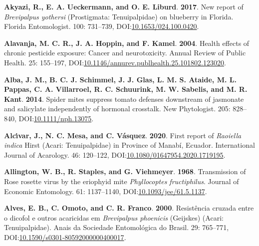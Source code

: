 \documentclass[12pt,final,CPage]{ufthesis}
\newlength{\cslhangindent}
\newenvironment{CSLReferences}[2] %
{%
	\setlength{\parindent}{0pt}
	\ifodd #1 \everypar{\setlength{\hangindent}{\cslhangindent}}\ignorespaces\fi
	\ifnum #2 > 0
	\setlength{\parskip}{#2\baselineskip}
	\fi
}%
{}
\begin{document}
{\begin{CSLReferences}{1}{0}
  \leavevmode{}%
  \textbf{Akyazi, R., E. A. Ueckermann, and O. E. Liburd}. \textbf{2017}. New report of {\emph{Brevipalpus yothersi}} ({Prostigmata}: {Tenuipalpidae}) on blueberry in {Florida}. Florida Entomologist. 100: 731--739, DOI:\href{https://doi.org/10.1653/024.100.0420}{10.1653/024.100.0420}.

  \leavevmode{}%
  \textbf{Alavanja, M. C. R., J. A. Hoppin, and F. Kamel}. \textbf{2004}. Health effects of chronic pesticide exposure: Cancer and neurotoxicity. Annual Review of Public Health. 25: 155--197, DOI:\href{https://doi.org/10.1146/annurev.publhealth.25.101802.123020}{10.1146/annurev.publhealth.25.101802.123020}.

  \leavevmode{}%
  \textbf{Alba, J. M., B. C. J. Schimmel, J. J. Glas, L. M. S. Ataide, M. L. Pappas, C. A. Villarroel, R. C. Schuurink, M. W. Sabelis, and M. R. Kant}. \textbf{2014}. Spider mites suppress tomato defenses downstream of jasmonate and salicylate independently of hormonal crosstalk. New Phytologist. 205: 828--840, DOI:\href{https://doi.org/10.1111/nph.13075}{10.1111/nph.13075}.

  \leavevmode{}%
  \textbf{Alcı́var, J., N. C. Mesa, and C. Vásquez}. \textbf{2020}. First report of {\emph{Raoiella indica}} {Hirst} ({Acari}: {Tenuipalpidae}) in {Province} of {Manab{í}}, {Ecuador}. International Journal of Acarology. 46: 120--122, DOI:\href{https://doi.org/10.1080/01647954.2020.1719195}{10.1080/01647954.2020.1719195}.

  \leavevmode{}%
  \textbf{Allington, W. B., R. Staples, and G. Viehmeyer}. \textbf{1968}. Transmission of {Rose rosette virus} by the eriophyid mite {\emph{Phyllocoptes fructiphilus}}. Journal of Economic Entomology. 61: 1137--1140, DOI:\href{https://doi.org/10.1093/jee/61.5.1137}{10.1093/jee/61.5.1137}.

  \leavevmode{}%
  \textbf{Alves, E. B., C. Omoto, and C. R. Franco}. \textbf{2000}. Resist{ê}ncia cruzada entre o dicofol e outros acaricidas em {\emph{Brevipalpus phoenicis}} ({Geijskes}) ({Acari}: {Tenuipalpidae}). Anais da Sociedade Entomol{ó}gica do Brasil. 29: 765--771, DOI:\href{https://doi.org/10.1590/s0301-80592000000400017}{10.1590/s0301-80592000000400017}.


\end{CSLReferences}}
\end{document}
